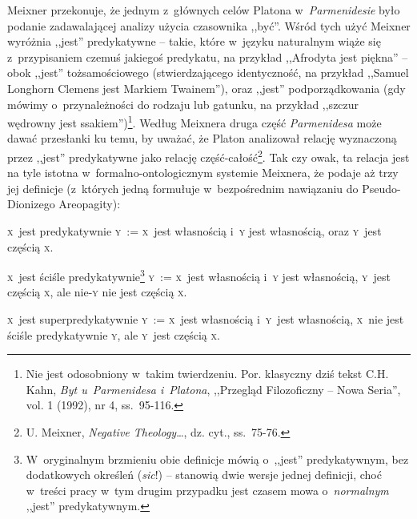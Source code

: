 Meixner przekonuje, że jednym z~głównych celów Platona w~\textit{Parmenidesie} było podanie zadawalającej analizy użycia czasownika ,,być''. Wśród tych użyć Meixner wyróżnia ,,jest'' predykatywne -- takie, które w~języku naturalnym wiąże się z~przypisaniem czemuś jakiegoś predykatu, na przykład ,,Afrodyta jest piękna'' -- obok ,,jest'' tożsamościowego (stwierdzającego identyczność, na przykład ,,Samuel Longhorn Clemens jest Markiem Twainem''), oraz ,,jest'' podporządkowania (gdy mówimy o~przynależności do rodzaju lub gatunku, na przykład ,,szczur wędrowny jest ssakiem'')\footnote{Nie jest odosobniony w~takim twierdzeniu. Por. klasyczny dziś tekst C.H. Kahn, \textit{Byt u~Parmenidesa i~Platona}, ,,Przegląd Filozoficzny -- Nowa Seria'', vol. 1 (1992), nr 4, ss.~95-116.}. Według Meixnera druga część \textit{Parmenidesa} może dawać przesłanki ku temu, by uważać, że Platon analizował relację wyznaczoną przez ,,jest'' predykatywne jako relację część-całość\footnote{U. Meixner, \textit{Negative Theology}\ldots, dz. cyt., ss.~75-76.}. Tak czy owak, ta relacja jest na tyle istotna w~formalno-ontologicznym systemie Meixnera, że podaje aż trzy jej definicje (z~których jedną formułuje w~bezpośrednim nawiązaniu do Pseudo-Dionizego Areopagity):
\begin{defin}\label{mei-def3}
\textsc{x}~jest predykatywnie \textsc{y}~:= \textsc{x}~jest własnością i~\textsc{y} jest własnością, oraz \textsc{y}~jest częścią \textsc{x}.
\end{defin}
\begin{defin}\label{mei-def4}
\textsc{x}~jest ściśle predykatywnie\footnote{W~oryginalnym brzmieniu obie definicje mówią o~,,jest'' predykatywnym, bez dodatkowych określeń (\textit{\textit{sic}}!) -- stanowią dwie wersje jednej definicji, choć w~treści pracy w~tym drugim przypadku jest czasem mowa o~\textit{normalnym} ,,jest'' predykatywnym.} \textsc{y}~:= \textsc{x}~jest własnością i~\textsc{y} jest własnością, \textsc{y}~jest częścią \textsc{x}, ale nie-\textsc{y} nie jest częścią \textsc{x}.
\end{defin}
\begin{defin}\label{mei-def5}
\textsc{x}~jest superpredykatywnie \textsc{y}~:= \textsc{x}~jest własnością i~\textsc{y}~jest własnością, \textsc{x}~nie jest ściśle predykatywnie \textsc{y}, ale \textsc{y}~jest częścią \textsc{x}.
\end{defin}

